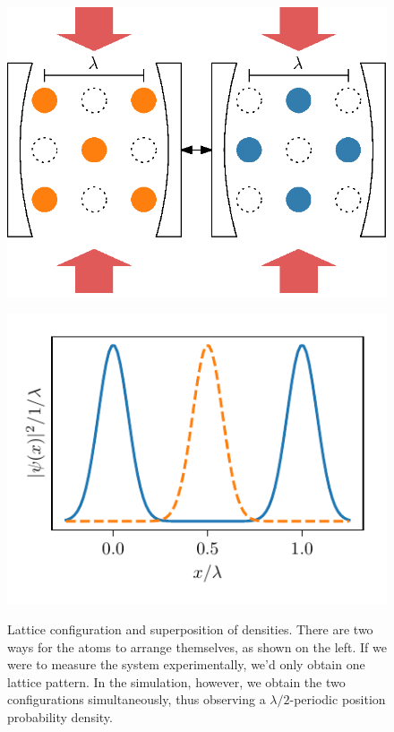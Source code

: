 \begin{figure}[!htb]
	\begin{minipage}[b]{.5\linewidth}
	\centering
	\includegraphics[width=.9\textwidth]{images/lattice_drawing.eps}
	\label{lattice_structure}
	\end{minipage}
%
	\begin{minipage}[b]{.5\linewidth}
	\centering
	\includegraphics[width=.9\textwidth]{images/density_superposition.pdf}
	\label{densities_super}
	\end{minipage}
\caption{Lattice configuration and superposition of densities. There are two ways for the atoms to arrange themselves, as shown on the left. If we were to measure the system experimentally, we'd only obtain one lattice pattern. In the simulation, however, we obtain the two configurations simultaneously, thus observing a $\lambda/2$-periodic position probability density.}
\label{densities_superposition}
\end{figure}
\FloatBarrier

